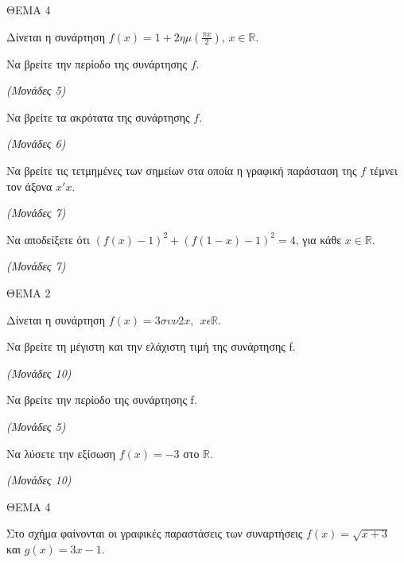 \documentclass[11pt,a4paper,twoside]{book}
\newcommand{\monades}[1]{\hfill \textit{(Μονάδες #1)}}
\begin{document}
\vspace{4mm}

ΘΕΜΑ 4

Δίνεται η συνάρτηση $f(x) = 1 + 2\eta\mu\left(\frac{\pi x}{2}\right)$, $x \in \mathbb{R}$.

\begin{alist}
\item Να βρείτε την περίοδο της συνάρτησης $f$.

\monades{5}

\item Να βρείτε τα ακρότατα της συνάρτησης $f$.

\monades{6}

\item Να βρείτε τις τετμημένες των σημείων στα οποία η γραφική παράσταση της $f$ τέμνει τον άξονα $x'x$.

\monades{7}

\item Να αποδείξετε ότι $(f(x) - 1)^2 + (f(1-x) - 1)^2 = 4$, για κάθε $x \in \mathbb{R}$.

\monades{7}
\end{alist}

\vspace{4mm}

ΘΕΜΑ 2

Δίνεται η συνάρτηση $f(x) = 3\sigma\upsilon\nu 2x,\ \ x\epsilon\mathbb{R}.$

\begin{alist}
\item

\begin{rlist}
\item Να βρείτε τη μέγιστη και την ελάχιστη τιμή της συνάρτησης f.

\monades{10}

\item Να βρείτε την περίοδο της συνάρτησης f.

\monades{5}

\end{rlist}
\item Να λύσετε την εξίσωση $f(x) = - 3$ στο $\mathbb{R}.$

\monades{10}
\end{alist}

\vspace{4mm}

ΘΕΜΑ 4

Στο σχήμα φαίνονται οι γραφικές παραστάσεις των συναρτήσεις $f(x) = \sqrt{x + 3}$ και $g(x) = 3x - 1$.
\end{document}
